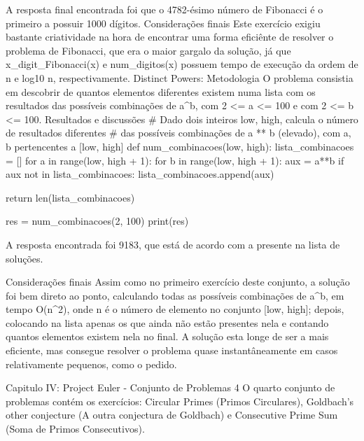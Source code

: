             A resposta final encontrada foi que o 4782-ésimo número de Fibonacci é o primeiro a possuir 1000 dígitos.
        Considerações finais
            Este exercício exigiu bastante criatividade na hora de encontrar uma forma eficiênte de resolver o problema de Fibonacci, que era o maior gargalo da solução, já que x_digit_Fibonacci(x) e num_digitos(x) possuem tempo de execução da ordem de n e log10 n, respectivamente. 
    Distinct Powers:
        Metodologia
            O problema consistia em descobrir de quantos elementos diferentes existem numa lista com os resultados das possíveis combinações de a^b, com 2 <= a <= 100 e com 2 <= b <= 100.
        Resultados e discussões
            # Dado dois inteiros low, high, calcula o número de resultados diferentes 
            # das possíveis combinações de a ** b (elevado), com a, b pertencentes a [low, high]
            def num_combinacoes(low, high):
                lista_combinacoes = []
                for a in range(low, high + 1):
                    for b in range(low, high + 1):
                        aux = a**b
                        if aux not in lista_combinacoes:
                            lista_combinacoes.append(aux)
                
                return len(lista_combinacoes)

            res = num_combinacoes(2, 100)
            print(res)

            A resposta encontrada foi 9183, que está de acordo com a presente na lista de soluções.

        Considerações finais
            Assim como no primeiro exercício deste conjunto, a solução foi bem direto ao ponto, calculando todas as possíveis combinações de a^b, em tempo O(n^2), onde n é o número de elemento no conjunto [low, high]; depois, colocando na lista apenas os que ainda não estão presentes nela e contando quantos elementos existem nela no final. A solução esta longe de ser a mais eficiente, mas consegue resolver o problema quase instantâneamente em casos relativamente pequenos, como o pedido.

Capitulo IV: Project Euler - Conjunto de Problemas 4
    O quarto conjunto de problemas contém os exercícios: Circular Primes (Primos Circulares), Goldbach's other conjecture (A outra conjectura de Goldbach) e Consecutive Prime Sum (Soma de Primos Consecutivos).

